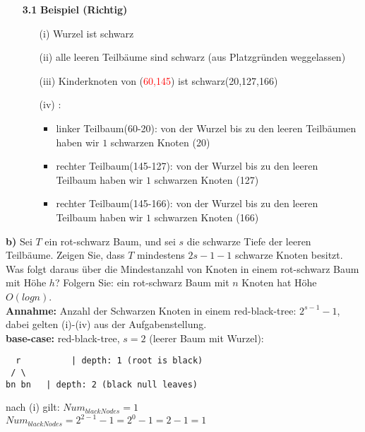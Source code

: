 \begin{enumerate}
\item[\textbf{3.1}]\textbf{Beispiel (Richtig)}


\begin{itemize}
	\item[(i)] Wurzel ist schwarz
	\item[(ii)] alle leeren Teilbäume sind schwarz (aus Platzgründen weggelassen)
	\item[(iii)] Kinderknoten von (\textcolor{red}{60,145}) ist schwarz(20,127,166)
	\item[(iv)]:
	\begin{itemize}
		\item linker Teilbaum(60-20): von der Wurzel bis zu den leeren Teilbäumen haben wir $1$ schwarzen Knoten (20)
		\item rechter Teilbaum(145-127): von der Wurzel bis zu den leeren Teilbaum haben wir $1$ schwarzen Knoten (127)
		\item rechter Teilbaum(145-166): von der Wurzel bis zu den leeren Teilbaum haben wir $1$ schwarzen Knoten (166)
	\end{itemize}
\end{itemize}
\end{enumerate}


\newpage
\noindent
\textbf{b)} Sei $T$ ein rot-schwarz Baum, und sei $s$ die schwarze Tiefe der leeren Teilbäume. Zeigen Sie, dass $T$ mindestens $2s-1 - 1$ schwarze Knoten besitzt. Was folgt daraus über die Mindestanzahl von Knoten in einem rot-schwarz Baum mit Höhe $h$? Folgern Sie: ein rot-schwarz Baum mit $n$ Knoten hat Höhe $O(log n)$.\\


\textbf{Annahme:} Anzahl der Schwarzen Knoten in einem red-black-tree: $2^{s-1}-1$, dabei gelten (i)-(iv) aus der Aufgabenstellung.\\
\textbf{base-case:} red-black-tree, $s=2$ (leerer Baum mit Wurzel):

\begin{verbatim}
  r 		 | depth: 1 (root is black)
 / \
bn bn 	| depth: 2 (black null leaves)
\end{verbatim}
nach (i) gilt: $Num_{blackNodes}=1$\\
$Num_{blackNodes}=2^{2-1}-1=2^{0}-1=2-1=1$\\

